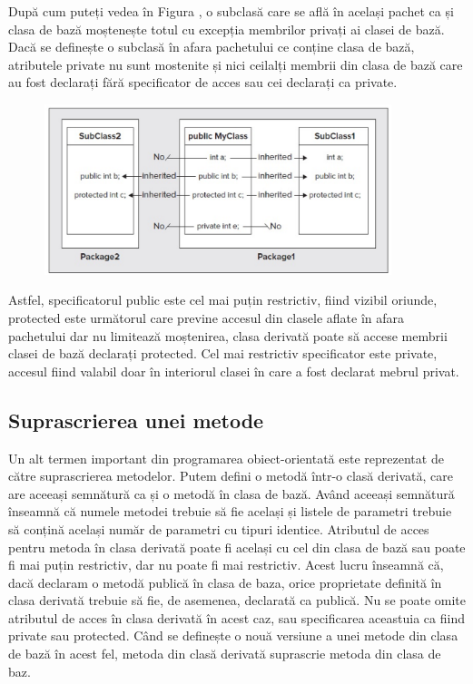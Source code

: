 După cum puteți vedea în Figura , o subclasă care se află în același pachet ca și clasa de bază moștenește totul cu excepția membrilor privați ai clasei de bază. Dacă se definește o subclasă în afara pachetului ce conține clasa de bază, atributele private nu sunt mostenite și nici ceilalți membrii din clasa de bază care au fost declarați fără specificator de acces sau cei declarați ca private.\newline
\begin{figure}[!hp]
\centering
\includegraphics[width=0.9\textwidth]
{imagini/mostenire2.eps}
\end{figure}
Astfel, specificatorul public este cel mai puțin restrictiv, fiind vizibil oriunde, protected este următorul care previne accesul din clasele aflate în afara pachetului dar nu limitează moștenirea, clasa derivată poate să accese membrii clasei de bază declarați protected. Cel mai restrictiv specificator este private, accesul fiind valabil doar în interiorul clasei în care a fost declarat mebrul privat.

\subsection{Suprascrierea unei metode}
Un alt termen important din programarea obiect-orientată este reprezentat de către suprascrierea metodelor.
Putem defini o metodă într-o clasă derivată, care are aceeași semnătură ca și o metodă în clasa de bază. Având aceeași semnătură înseamnă că numele metodei trebuie să fie același și listele de parametri trebuie să conțină același număr de parametri cu tipuri identice. Atributul de acces pentru metoda în clasa derivată poate fi același cu cel din clasa de bază sau poate fi mai puțin restrictiv, dar nu poate fi mai restrictiv. Acest lucru înseamnă că, dacă declaram o metodă publică în clasa de baza, orice proprietate definită în clasa derivată trebuie să fie, de asemenea, declarată ca publică. Nu se poate omite atributul de acces în clasa derivată în acest caz, sau specificarea aceastuia ca fiind private sau protected.
Când se definește o nouă versiune a unei metode din clasa de bază în acest fel, metoda din clasă derivată suprascrie metoda din clasa de baz. \cite{14} \newline

